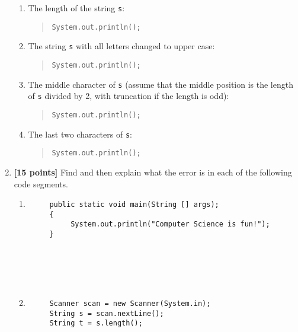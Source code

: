 \documentclass[11pt]{report}
\begin{document}
\begin{enumerate}
\begin{enumerate}
\item
The length of the string {\tt s}:

\bigskip
\bigskip
\bigskip
\begin{quote}
\verb$System.out.println($\underline{\hspace{3in}}\verb$);$
\end{quote}
\item
The string {\tt s} with all letters changed to upper case:

\bigskip
\bigskip
\bigskip
\begin{quote}
\verb$System.out.println($\underline{\hspace{3in}}\verb$);$
\end{quote}


\item
The middle character of {\tt s} (assume that the middle position is
the length of {\tt s} divided by 2, with truncation if the length is
odd):

\bigskip
\bigskip
\bigskip
\begin{quote}
\verb$System.out.println($\underline{\hspace{3in}}\verb$);$
\end{quote}

\item
The last two characters of {\tt s}:

\bigskip
\bigskip
\bigskip
\begin{quote}
\verb$System.out.println($\underline{\hspace{3in}}\verb$);$
\end{quote}
\end{enumerate}

\bigskip
\item {\bf [15 points]}
Find and then explain what the error is in each of the following code segments.
\begin{enumerate}
\item \mbox{}

\begin{verbatim}
     public static void main(String [] args);
     {
          System.out.println("Computer Science is fun!");
     }
     
     
     
     
     
\end{verbatim}
\item \mbox{}

\begin{verbatim}
     Scanner scan = new Scanner(System.in);
     String s = scan.nextLine();
     String t = s.length();
     

\end{verbatim}
\end{enumerate}
\end{enumerate}
\end{document}
